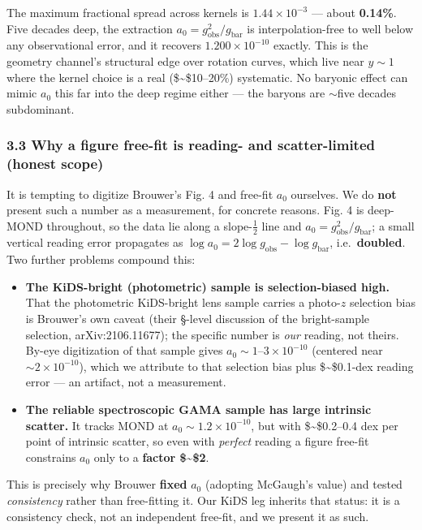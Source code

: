 \documentclass[
]{article}
\providecommand{\tightlist}{%
  \setlength{\itemsep}{0pt}\setlength{\parskip}{0pt}}
\begin{document}
The maximum fractional spread across kernels is \(1.44\times10^{-3}\)
--- about \textbf{0.14\%}. Five decades deep, the extraction
\(a_0 = g_\mathrm{obs}^2/g_\mathrm{bar}\) is interpolation-free to well below
any observational error, and it recovers \(1.200\times10^{-10}\)
exactly. This is the geometry channel's structural edge over rotation
curves, which live near \(y\sim1\) where the kernel choice is a real
(\$\sim\$10--20\%) systematic. No baryonic effect can mimic \(a_0\) this
far into the deep regime either --- the baryons are \(\sim\)five decades
subdominant.

\subsubsection{3.3 Why a figure free-fit is reading- and scatter-limited
(honest
scope)}\label{why-a-figure-free-fit-is-reading--and-scatter-limited-honest-scope}

It is tempting to digitize Brouwer's Fig. 4 and free-fit \(a_0\)
ourselves. We do \textbf{not} present such a number as a measurement,
for concrete reasons. Fig. 4 is deep-MOND throughout, so the data lie
along a slope-\(\tfrac12\) line and \(a_0 = g_\mathrm{obs}^2/g_\mathrm{bar}\);
a small vertical reading error propagates as
\(\log a_0 = 2\log g_\mathrm{obs} - \log g_\mathrm{bar}\),
i.e.~\textbf{doubled}. Two further problems compound this:

\begin{itemize}
\tightlist
\item
  \textbf{The KiDS-bright (photometric) sample is selection-biased
  high.} That the photometric KiDS-bright lens sample carries a
  photo-\(z\) selection bias is Brouwer's own caveat (their §-level
  discussion of the bright-sample selection, arXiv:2106.11677); the
  specific number is \emph{our} reading, not theirs. By-eye digitization
  of that sample gives \(a_0\sim1\)--\(3\times10^{-10}\) (centered near
  \(\sim2\times10^{-10}\)), which we attribute to that selection bias
  plus \$\sim\$0.1-dex reading error --- an artifact, not a measurement.
\item
  \textbf{The reliable spectroscopic GAMA sample has large intrinsic
  scatter.} It tracks MOND at \(a_0\sim1.2\times10^{-10}\), but with
  \$\sim\$0.2--0.4 dex per point of intrinsic scatter, so even with
  \emph{perfect} reading a figure free-fit constrains \(a_0\) only to a
  \textbf{factor \$\sim\$2}.
\end{itemize}

This is precisely why Brouwer \textbf{fixed} \(a_0\) (adopting McGaugh's
value) and tested \emph{consistency} rather than free-fitting it. Our
KiDS leg inherits that status: it is a consistency check, not an
independent free-fit, and we present it as such.
\end{document}
